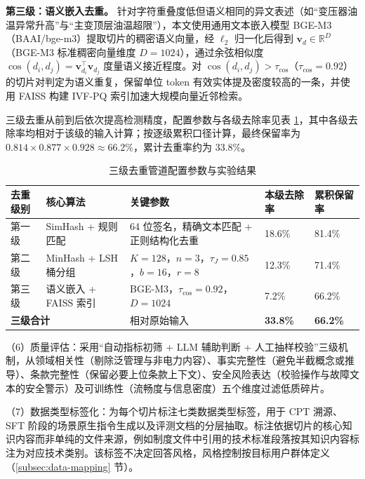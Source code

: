 \documentclass[fontset=fandol,type=master,campus=shenzhen,etitleauto=true]{hithesisbook}
\begin{document}
\textbf{第三级：语义嵌入去重。} 针对字符重叠度低但语义相同的异文表述（如``变压器油温异常升高''与``主变顶层油温超限''），本文使用通用文本嵌入模型 BGE-M3（BAAI/bge-m3）提取切片的稠密语义向量，经 $\ell_2$ 归一化后得到 $\mathbf{v}_d \in \mathbb{R}^{D}$（BGE-M3 标准稠密向量维度 $D = 1024$），通过余弦相似度 $\cos(d_i, d_j) = \mathbf{v}_{d_i}^{\top} \mathbf{v}_{d_j}$ 度量语义接近程度。对 $\cos(d_i, d_j) > \tau_{\cos}$（$\tau_{\cos} = 0.92$）的切片对判定为语义重复，保留单位 token 有效实体提及密度较高的一条，并使用 FAISS 构建 IVF-PQ 索引加速大规模向量近邻检索\cite{ref63}。

三级去重从前到后依次提高检测精度，配置参数与各级去除率见表 \ref{tab:dedup-pipeline}，其中各级去除率均相对于该级的输入计算；按逐级累积口径计算，最终保留率为 $0.814 \times 0.877 \times 0.928 \approx 66.2\%$，累计去重率约为 33.8\%。

\begin{table}[htbp]
\centering
\caption{三级去重管道配置参数与实验结果}
\label{tab:dedup-pipeline}
\small
\setlength{\tabcolsep}{4pt}
\begin{tabular}{p{2.0cm}p{3.4cm}p{4.4cm}p{1.9cm}p{1.9cm}}
\toprule
\textbf{去重级别} & \textbf{核心算法} & \textbf{关键参数} & \textbf{本级去除率} & \textbf{累积保留率} \\
\midrule
第一级 & SimHash + 规则匹配 & 64 位签名，精确文本匹配 + 正则结构化去重 & 18.6\% & 81.4\% \\
\midrule
第二级 & MinHash + LSH 桶分组 & $K = 128$，$n = 3$，$\tau_J = 0.85$，$b = 16$，$r = 8$ & 12.3\% & 71.4\% \\
\midrule
第三级 & 语义嵌入 + FAISS 索引 & BGE-M3，$\tau_{\cos} = 0.92$，$D = 1024$ & 7.2\% & 66.2\% \\
\midrule
\multicolumn{2}{l}{\textbf{三级合计}} & 相对原始输入 & \textbf{33.8\%} & \textbf{66.2\%} \\
\bottomrule
\end{tabular}
\end{table}

\noindent （6）质量评估：采用``自动指标初筛 + LLM 辅助判断 + 人工抽样校验''三级机制，从领域相关性（剔除泛管理与非电力内容）、事实完整性（避免半截概念或推导）、条款完整性（保留必要上位条款上下文）、安全风险表达（校验操作与故障文本的安全警示）及可训练性（流畅度与信息密度）五个维度过滤低质碎片。

\noindent （7）数据类型标签化：为每个切片标注七类数据类型标签，用于 CPT 溯源、SFT 阶段的场景原生指令生成以及评测文档的分层抽取。标注依据切片的核心知识内容而非单纯的文件来源，例如制度文件中引用的技术标准段落按其知识内容标注为对应技术类别。该标签不决定回答风格，风格控制按目标用户群体定义（\ref{subsec:data-mapping} 节）。
\end{document}
